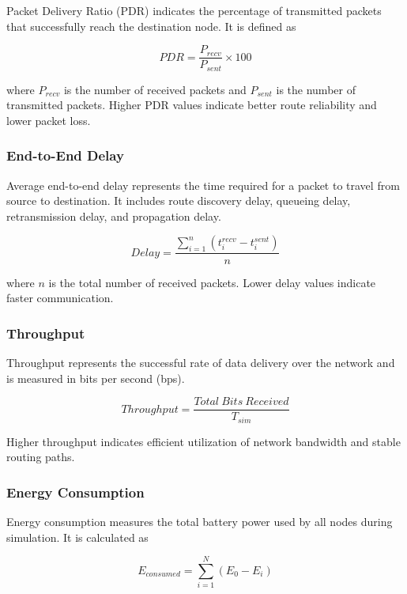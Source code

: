 \documentclass[a4paper,fleqn]{cas-dc}
\numberwithin{equation}{section}
\begin{document}
Packet Delivery Ratio (PDR) indicates the percentage of transmitted packets that successfully reach the destination node. It is defined as

\begin{equation}
PDR=\frac{P_{recv}}{P_{sent}}\times 100
\end{equation}

where $P_{recv}$ is the number of received packets and $P_{sent}$ is the number of transmitted packets. Higher PDR values indicate better route reliability and lower packet loss.

\subsubsection{End-to-End Delay}

Average end-to-end delay represents the time required for a packet to travel from source to destination. It includes route discovery delay, queueing delay, retransmission delay, and propagation delay.

\begin{equation}
Delay=\frac{\sum_{i=1}^{n}(t_i^{recv}-t_i^{sent})}{n}
\end{equation}

where $n$ is the total number of received packets. Lower delay values indicate faster communication.

\subsubsection{Throughput}

Throughput represents the successful rate of data delivery over the network and is measured in bits per second (bps).

\begin{equation}
Throughput=\frac{Total\ Bits\ Received}{T_{sim}}
\end{equation}

Higher throughput indicates efficient utilization of network bandwidth and stable routing paths.

\subsubsection{Energy Consumption}

Energy consumption measures the total battery power used by all nodes during simulation. It is calculated as

\begin{equation}
E_{consumed}=\sum_{i=1}^{N}(E_0-E_i)
\end{equation}
\end{document}
